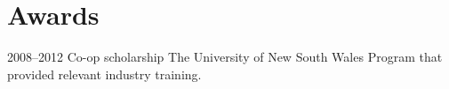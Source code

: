 \documentclass[]{friggeri-cv} %
\begin{document}

\section{Awards}

\begin{entrylist}


\entry
{2008--2012}
{Co-op scholarship}
{The University of New South Wales}
{Program that provided relevant industry training.}


\end{entrylist}
\end{document}
